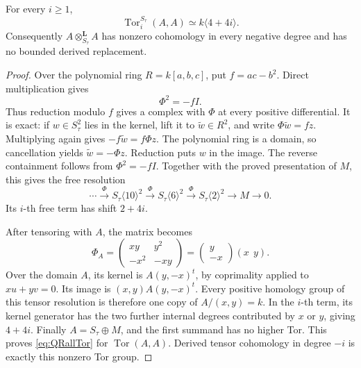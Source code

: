 \begin{finding}\label{prop:QRallTor}
For every \(i\geq1\),
\begin{equation}\label{eq:QRallTor}
             \operatorname{Tor}^{S_\tau}_i(A,A)
                    \simeq k\langle4+4i\rangle.
\end{equation}
Consequently \(A\otimes^{\mathbf L}_{S_\tau}A\)
has nonzero cohomology in every negative degree
and has no bounded derived replacement.
\end{finding}

\begin{proof}
Over the polynomial ring \(R=k[a,b,c]\), put
\(f=ac-b^2\). Direct multiplication gives
\[
                         \Phi^2=-fI.
\]
Thus reduction modulo \(f\) gives a complex with
\(\Phi\) at every positive differential. It is exact:
if \(w\in S_\tau^2\) lies in the kernel, lift it
to \(\widetilde w\in R^2\), and write
\(\Phi\widetilde w=fz\). Multiplying again gives
\(-f\widetilde w=f\Phi z\). The polynomial ring is
a domain, so cancellation yields
\(\widetilde w=-\Phi z\). Reduction puts \(w\)
in the image. The reverse containment follows
from \(\Phi^2=-fI\).
Together with the proved presentation of \(M\),
this gives the free resolution
\[
 \cdots\xrightarrow{\Phi}S_\tau\langle10\rangle^2
 \xrightarrow{\Phi}S_\tau\langle6\rangle^2
 \xrightarrow{\Phi}S_\tau\langle2\rangle^2
 \longrightarrow M\longrightarrow0.
\]
Its \(i\)-th free term has shift \(2+4i\).

After tensoring with \(A\), the matrix becomes
\[
 \Phi_A=
 \begin{pmatrix}xy&y^2\\-x^2&-xy\end{pmatrix}
      =\begin{pmatrix}y\\-x\end{pmatrix}(x\ \ y).
\]
Over the domain \(A\), its kernel is
\(A(y,-x)^t\), by coprimality applied to
\(xu+yv=0\). Its image is
\((x,y)A(y,-x)^t\). Every positive homology group
of this tensor resolution is therefore one copy
of \(A/(x,y)=k\).
In the \(i\)-th term, its kernel generator has
the two further internal degrees contributed
by \(x\) or \(y\), giving \(4+4i\).
Finally \(A=S_\tau\oplus M\), and the first
summand has no higher Tor. This proves
\eqref{eq:QRallTor} for \(\operatorname{Tor}(A,A)\).
Derived tensor cohomology in degree \(-i\) is
exactly this nonzero Tor group.
\end{proof}

